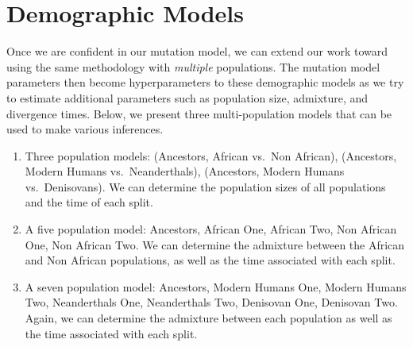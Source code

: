 \section{Demographic Models}\label{sec:demographicModels}
Once we are confident in our mutation model, we can extend our work toward using the same methodology with
\emph{multiple} populations.
The mutation model parameters then become hyperparameters to these demographic models as we try to estimate
additional parameters such as population size, admixture, and divergence times.
Below, we present three multi-population models that can be used to make various inferences.
\begin{enumerate}
    \item Three population models: (Ancestors, African vs.\ Non African), (Ancestors, Modern Humans vs.\ Neanderthals),
        (Ancestors, Modern Humans vs.\ Denisovans).
        We can determine the population sizes of all populations and the time of each split.
    \item A five population model: Ancestors, African One, African Two, Non African One, Non African Two.
        We can determine the admixture between the African and Non African populations, as well as the time associated
        with each split.
    \item A seven population model: Ancestors, Modern Humans One, Modern Humans Two, Neanderthals One, Neanderthals Two,
        Denisovan One, Denisovan Two.
        Again, we can determine the admixture between each population as well as the time associated with each split.
\end{enumerate}
%
